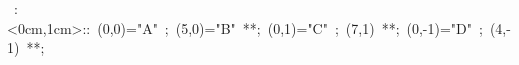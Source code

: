 
\hbox{
\xy    <1cm,0cm>:<0cm,1cm>::
       (0,0)="A" ; (5,0)="B" **\dir{-}; 
       (0,1)="C" ; (7,1) **\dir{-};
       (0,-1)="D" ; (4,-1) **\dir{-};
       \endxy}
	   

